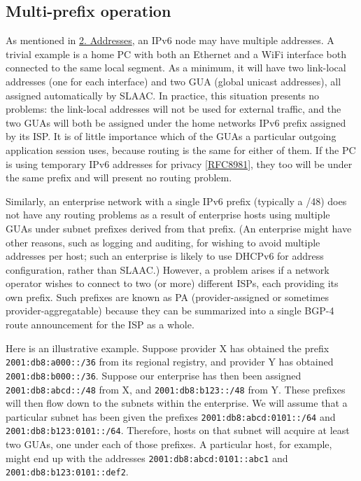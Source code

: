 \documentclass[
]{article}
\begin{document}
\pagebreak

\subsection{Multi-prefix operation}\label{multi-prefix-operation}

As mentioned in \hyperref[addresses]{2. Addresses}, an IPv6 node may
have multiple addresses. A trivial example is a home PC with both an
Ethernet and a WiFi interface both connected to the same local segment.
As a minimum, it will have two link-local addresses (one for each
interface) and two GUA (global unicast addresses), all assigned
automatically by SLAAC. In practice, this situation presents no
problems: the link-local addresses will not be used for external
traffic, and the two GUAs will both be assigned under the home
network\textquotesingle s IPv6 prefix assigned by its ISP. It is of
little importance which of the GUAs a particular outgoing application
session uses, because routing is the same for either of them. If the PC
is using temporary IPv6 addresses for privacy
{[}\href{https://www.rfc-editor.org/info/rfc8981}{RFC8981}{]}, they too
will be under the same prefix and will present no routing problem.

Similarly, an enterprise network with a single IPv6 prefix (typically a
/48) does not have any routing problems as a result of enterprise hosts
using multiple GUAs under subnet prefixes derived from that prefix. (An
enterprise might have other reasons, such as logging and auditing, for
wishing to avoid multiple addresses per host; such an enterprise is
likely to use DHCPv6 for address configuration, rather than SLAAC.)
However, a problem arises if a network operator wishes to connect to two
(or more) different ISPs, each providing its own prefix. Such prefixes
are known as PA (provider-assigned or sometimes provider-aggregatable)
because they can be summarized into a single BGP-4 route announcement
for the ISP as a whole.

Here is an illustrative example. Suppose provider X has obtained the
prefix \texttt{2001:db8:a000::/36} from its regional registry, and
provider Y has obtained \texttt{2001:db8:b000::/36}. Suppose our
enterprise has then been assigned \texttt{2001:db8:abcd::/48} from X,
and \texttt{2001:db8:b123::/48} from Y. These prefixes will then flow
down to the subnets within the enterprise. We will assume that a
particular subnet has been given the prefixes
\texttt{2001:db8:abcd:0101::/64} and \texttt{2001:db8:b123:0101::/64}.
Therefore, hosts on that subnet will acquire at least two GUAs, one
under each of those prefixes. A particular host, for example, might end
up with the addresses \texttt{2001:db8:abcd:0101::abc1} and
\texttt{2001:db8:b123:0101::def2}.
\end{document}
